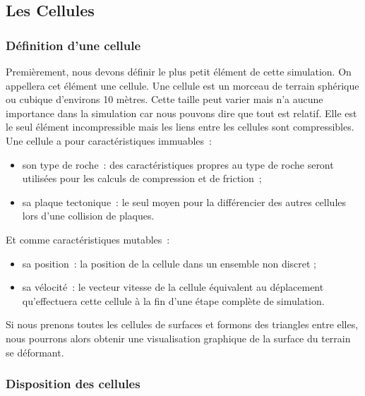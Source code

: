 \documentclass[a4paper,11pt]{article}
\begin{document}
\subsection{Les Cellules}
\subsubsection{Définition d'une cellule}

Premièrement, nous devons définir le plus petit élément de cette simulation. On appellera cet élément une cellule.
Une cellule est un morceau de terrain sphérique ou cubique d'environs 10 mètres. Cette taille peut varier mais n'a aucune importance dans la simulation car nous pouvons dire que tout est relatif.
Elle est le seul élément incompressible mais les liens entre les cellules sont compressibles.
Une cellule a pour caractéristiques immuables~:
\begin{itemize}
  \item son type de roche~: des caractéristiques propres au type de roche seront utilisées pour les calculs de compression et de friction~;
  \item sa plaque tectonique~: le seul moyen pour la différencier des autres cellules lors d'une collision de plaques.
\end{itemize}
Et comme caractéristiques mutables~:
\begin{itemize}
  \item sa position~: la position de la cellule dans un ensemble non discret ;
  \item sa vélocité~: le vecteur vitesse de la cellule équivalent au déplacement qu'effectuera cette cellule à la fin d'une étape complète de simulation.
\end{itemize}

Si nous prenons toutes les cellules de surfaces et formons des triangles entre elles, nous pourrons alors obtenir une visualisation graphique de la surface du terrain se déformant.

\subsubsection{Disposition des cellules}
\end{document}
